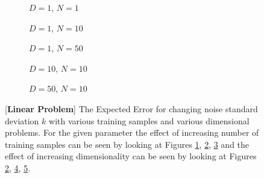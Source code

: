 \begin{figure}[!h]
  \centering
    \begin{subfigure}{0.3\textwidth}
      \centering
      \caption{$D=1$, $N=1$}
      \label{fig:linear-b-N-1-D-1}
    \end{subfigure}
    \begin{subfigure}{0.3\textwidth}
      \centering
      \caption{$D=1$, $N=10$}
      \label{fig:linear-b-N-10-D-1}
    \end{subfigure}
    \begin{subfigure}{0.3\textwidth}
      \centering
      \caption{$D=1$, $N=50$}
      \label{fig:linear-b-N-50-D-1}
    \end{subfigure}

    \begin{subfigure}{0.3\textwidth}
      \centering
      \caption{$D=10$, $N=10$}
      \label{fig:linear-b-N-10-D-10}
    \end{subfigure}
    \begin{subfigure}{0.3\textwidth}
      \centering
      \caption{$D=50$, $N=10$}
      \label{fig:linear-b-N-10-D-50}
    \end{subfigure}  

  \caption{[\textbf{Linear Problem}] The Expected Error for changing noise standard deviation $k$ with various training samples and various dimensional problems. For the given parameter the effect of increasing number of training samples can be seen by looking at Figures \ref{fig:linear-b-N-1-D-1}, \ref{fig:linear-b-N-10-D-1}, \ref{fig:linear-b-N-50-D-1} and the effect of increasing dimensionality can be seen by looking at Figures \ref{fig:linear-b-N-10-D-1}, \ref{fig:linear-b-N-10-D-10}, \ref{fig:linear-b-N-10-D-50}.}\label{fig:linear-b}
\end{figure}



